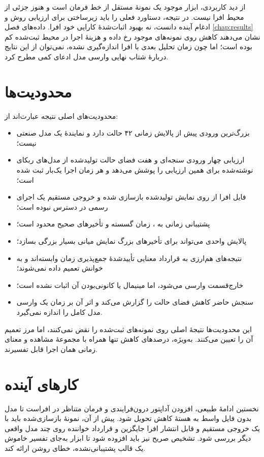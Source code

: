 از دید کاربردی، ابزار موجود یک نمونهٔ مستقل از خط فرمان است و هنوز جزئی از محیط افرا نیست. در نتیجه، دستاورد فعلی را باید زیرساختی برای ارزیابی روش و ادغام آینده دانست، نه بهبود اثبات‌شدهٔ کارایی خود افرا. داده‌های فصل \ref{chap:results} نشان می‌دهند کاهش روی نمونه‌های موجود رخ داده و هزینهٔ اجرا در محیط ثبت‌شده کم بوده است؛ اما چون زمان تحلیل بعدی با افرا اندازه‌گیری نشده، نمی‌توان از این نتایج دربارهٔ شتاب نهایی وارسی مدل ادعای کمی مطرح کرد.

\section{محدودیت‌ها}

محدودیت‌های اصلی نتیجه عبارت‌اند از:

\begin{itemize}
\item بزرگ‌ترین ورودی پیش از پالایش زمانی ۴۲ حالت دارد و نمایندهٔ یک مدل صنعتی نیست؛
\item ارزیابی چهار ورودی سنجه‌ای و هفت فضای حالت تولیدشده از مدل‌های ربکای نوشته‌شده برای همین ارزیابی را پوشش می‌دهد و هر زمان اجرا یک‌بار ثبت شده است؛
\item فایل افرا از روی نمایش تولیدشده بازسازی شده و خروجی مستقیم یک اجرای رسمی در دسترس نبوده است؛
\item پشتیبانی زمانی به ، زمان گسسته و تأخیرهای صحیح محدود است؛
\item پالایش واحدی می‌تواند برای تأخیرهای بزرگ نمایش میانی بسیار بزرگی بسازد؛
\item نتیجه‌های هم‌ارزی به قرارداد معنایی تأییدشدهٔ جمع‌پذیری زمان وابسته‌اند و به خوانش  تعمیم داده نمی‌شوند؛
\item خارج‌قسمت وارسی می‌شود، اما مینیمال یا کانونی‌بودن آن اثبات نشده است؛
\item سنجش حاضر کاهش فضای حالت را گزارش می‌کند و اثر آن بر زمان یک وارسی مدل کامل را اندازه نمی‌گیرد.
\end{itemize}

این محدودیت‌ها نتیجهٔ اصلی روی نمونه‌های ثبت‌شده را نقض نمی‌کنند، اما مرز تعمیم آن را تعیین می‌کنند. به‌ویژه، درصدهای کاهش تنها همراه با مجموعهٔ مشاهده و معنای زمانی همان اجرا قابل تفسیرند.

\section{کارهای آینده}

نخستین ادامهٔ طبیعی، افزودن آداپتور درون‌فرایندی و فرمان متناظر در افراست تا مدل بدون فایل واسط به هستهٔ کاهش تحویل شود. پیش از آن، نمونهٔ بازسازی‌شده باید با یک خروجی مستقیم و قابل انتشار افرا جایگزین و قرارداد خواننده روی چند مدل واقعی دیگر بررسی شود. تشخیص صریح  نیز باید افزوده شود تا ابزار به‌جای تفسیر خاموش یک قالب پشتیبانی‌نشده، خطای روشن ارائه کند.

